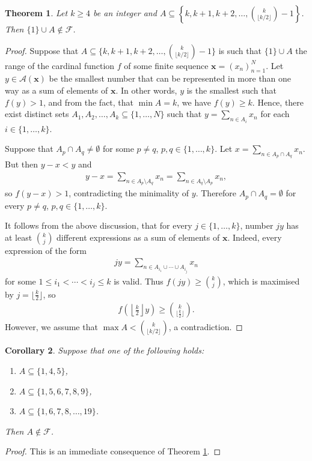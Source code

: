 \documentclass{amsart}
\newtheorem{theorem}{Theorem}[section]
\newtheorem{corollary}[theorem]{Corollary}
\theoremstyle{definition}
\begin{document}
\begin{theorem}\label{Thm1,A}
Let $k\geq 4$ be an integer and $A\subseteq \left\{k,k+1,k+2,\ldots, {k \choose \lfloor k/2 \rfloor}-1\right\}$. Then $\{1\}\cup A\notin \mathcal{F}$.
\end{theorem}
\begin{proof}
Suppose that $A\subseteq \{k,k+1,k+2,\ldots, {k \choose \lfloor k/2 \rfloor}-1\}$ is such that  $\{1\}\cup A$ the range of the cardinal function $f$ of some finite sequence $\textbf{x}=(x_n)_{n=1}^{N}$. Let $y\in\mathcal{A}(\textbf{x})$ be the smallest number that can be represented in more than one way as a sum of elements of $\textbf{x}$. In other words, $y$ is the smallest such that $f(y)>1$, and from the fact, that $\min A= k$, we have $f(y)\geq k$. Hence, there exist distinct sets $A_{1},A_{2},\ldots ,A_{k}\subseteq \{1,\ldots ,N\}$ such that $y=\sum_{n\in A_i}x_n$ for each $i\in\{1,\ldots,k\}$.

Suppose that $A_p\cap A_q\neq\emptyset$ for some $p\neq q$, $p,q\in\{1,\ldots,k\}$. Let $x=\sum_{n\in A_p\cap A_q}x_n$. But then $y-x<y$ and 
\begin{align*}
y-x = \sum_{n\in A_p\setminus A_q}x_n = \sum_{n\in A_q\setminus A_p}x_n,
\end{align*}
so $f(y-x)>1$, contradicting the minimality of $y$. Therefore $A_p\cap A_q=\emptyset$ for every $p\neq q$, $p,q\in\{1,\ldots,k\}$.

It follows from the above discussion, that for every $j\in\{1,\ldots ,k\}$, number $jy$ has at least $\binom{k}{j}$ different expressions as a sum of elements of $\textbf{x}$. Indeed, every expression of the form
\begin{align*}
jy = \sum_{n\in A_{i_{1}}\cup \cdots \cup A_{i_{j}}} x_{n}
\end{align*} 
for some $1\leq i_{1}<\cdots <i_{j}\leq k$ is valid. Thus $f(jy)\geq \binom{k}{j}$, which is maximised by $j=\lfloor\frac{k}{2}\rfloor$, so 
\begin{align*}
f\left(\left\lfloor\frac{k}{2}\right\rfloor y\right) \geq \binom{k}{\lfloor\frac{k}{2}\rfloor}.
\end{align*}
However, we assume that  $\max A<{k \choose \lfloor k/2 \rfloor}$, a contradiction.
\end{proof}


\begin{corollary}
Suppose that one of the following holds:
\begin{enumerate}
\item $A\subseteq \{1,4,5\}$,
\item $A\subseteq \{1,5,6,7,8,9\}$,
\item $A\subseteq \{1,6,7,8,\ldots,19\}$.
\end{enumerate}
Then $A\notin \mathcal{F}$.
\end{corollary}
\begin{proof}
This is an immediate consequence of Theorem \ref{Thm1,A}.
\end{proof}
\end{document}
